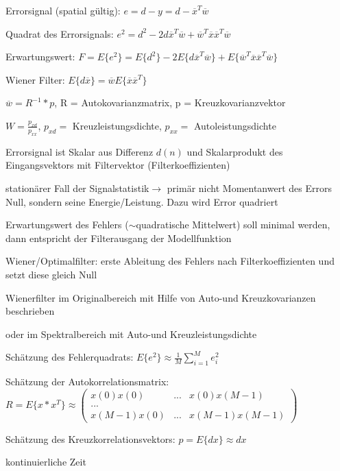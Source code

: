 \documentclass[a4paper]{article}
\begin{document}
\begin{multicols}{3}
\begin{itemize*}
    \item Errorsignal (spatial gültig): $e=d-y=d-\overline{x}^T \overline{w}$
    \item Quadrat des Errorsignals: $e^2=d^2-2d\overline{x}^T\overline{w}+\overline{w}^T\overline{x}\overline{x}^T\overline{w}$
    \item Erwartungswert: $F=E\{e^2\}=E\{d^2\}-2E\{d\overline{x}^T\overline{w}\}+E\{\overline{w}^T\overline{x}\overline{x}^T\overline{w}\}$
    \item Wiener Filter: $E\{d\overline{x}\}=\overline{w}E\{\overline{x}\overline{x}^T\}$
    \begin{itemize*}
      \item $\overline{w}=R^{-1}*p$, R = Autokovarianzmatrix, p = Kreuzkovarianzvektor
      \item $W=\frac{p_{xd}}{p_{xx}}$, $p_{xd}=$ Kreuzleistungsdichte, $p_{xx}=$ Autoleistungsdichte
    \end{itemize*}
    \item Errorsignal ist Skalar aus Differenz $d(n)$ und Skalarprodukt des Eingangsvektors mit Filtervektor (Filterkoeffizienten)
    \item stationärer Fall der Signalstatistik$\rightarrow$ primär nicht Momentanwert des Errors Null, sondern seine Energie/Leistung. Dazu wird Error quadriert%
    \item Erwartungswert des Fehlers ($\sim$quadratische Mittelwert) soll minimal werden, dann entspricht der Filterausgang der Modellfunktion
    \item Wiener/Optimalfilter: erste Ableitung des Fehlers nach Filterkoeffizienten und setzt diese gleich Null
    \item Wienerfilter im Originalbereich mit Hilfe von Auto-und Kreuzkovarianzen beschrieben
    \item oder im Spektralbereich mit Auto-und Kreuzleistungsdichte
    \item Schätzung des Fehlerquadrats: $E\{e^2\}\approx \frac{1}{M}\sum_{i=1}^M e_i^2$
    \item Schätzung der Autokorrelationsmatrix: $R=E\{x*x^T\}\approx\begin{pmatrix} x(0)x(0) &...& x(0)x(M-1)\\ ...\\ x(M-1)x(0)& ...& x(M-1)x(M-1)\end{pmatrix}$
    \item Schätzung des Kreuzkorrelationsvektors: $p=E\{dx\}\approx dx$
    \item kontinuierliche Zeit

\end{itemize*}
\end{multicols}
\end{document}

